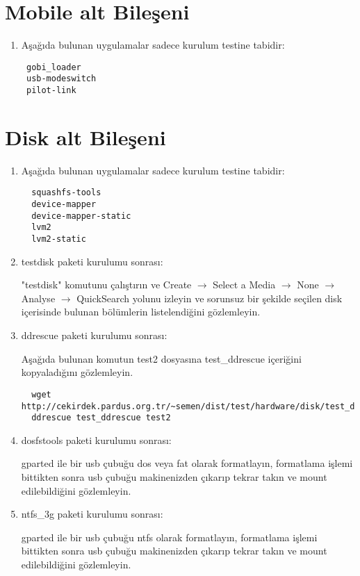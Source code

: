 \documentclass[a4paper,10pt]{article}
\begin{document}
\section{Mobile alt Bileşeni}
\begin{enumerate}
 \item Aşağıda bulunan uygulamalar sadece kurulum testine tabidir:
\begin{verbatim}
 gobi_loader
 usb-modeswitch
 pilot-link
\end{verbatim}

\end{enumerate}

\section{Disk alt Bileşeni}
\begin{enumerate}
 \item Aşağıda bulunan uygulamalar sadece kurulum testine tabidir:
\begin{verbatim}
  squashfs-tools
  device-mapper
  device-mapper-static
  lvm2
  lvm2-static
\end{verbatim}

\item testdisk paketi kurulumu sonrası:

 "testdisk" komutunu çalıştırın ve Create $\rightarrow$ Select a Media $\rightarrow$ None $\rightarrow$ Analyse $\rightarrow$ QuickSearch yolunu izleyin ve sorunsuz bir şekilde seçilen disk içerisinde bulunan bölümlerin listelendiğini gözlemleyin.

\item ddrescue paketi kurulumu sonrası:

Aşağıda bulunan komutun test2 dosyasına test\_ddrescue içeriğini kopyaladığını gözlemleyin.
 \begin{verbatim}
  wget http://cekirdek.pardus.org.tr/~semen/dist/test/hardware/disk/test_ddrescue
  ddrescue test_ddrescue test2
 \end{verbatim}

\item dosfstools paketi kurulumu sonrası:

gparted ile bir usb çubuğu dos veya fat olarak formatlayın, formatlama işlemi bittikten sonra usb çubuğu makinenizden çıkarıp tekrar takın ve mount edilebildiğini gözlemleyin. 

\item ntfs\_3g paketi kurulumu sonrası:

gparted ile bir usb çubuğu ntfs olarak formatlayın, formatlama işlemi bittikten sonra usb çubuğu makinenizden çıkarıp tekrar takın ve mount edilebildiğini gözlemleyin. 


\end{enumerate}
\end{document}
